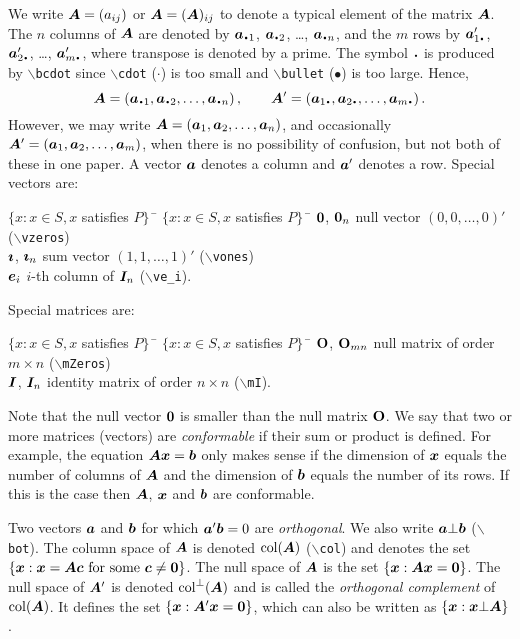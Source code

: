 \documentclass[11pt,dvips,a4paper]{article}
\newcommand{\hspacesymbols}%
   {$\{x: x \in S, x$ satisfies $P\}\;\;$} %
\newcommand{\type}[1]{{\tt$\backslash$#1}}
\begin{document}
We write $\bm A=(a_{ij})$ or $\bm A=(\bm A)_{ij}$ to denote a typical
element of the matrix $\bm A$.
The $n$ columns of $\bm A$ are denoted by
$\va_{\bcdot 1}$, $\va_{\bcdot 2}$, \dots, $\va_{\bcdot n}$,
and the $m$ rows by
$\va'_{1\bcdot}$, $\va'_{2\bcdot}$, \dots, $\va'_{m\bcdot}$,
where transpose is denoted by a prime.
The symbol $\bcdot$ is produced by \type{bcdot} since
\type{cdot} ($\cdot$) is too small
and \type{bullet} ($\bullet$) is too large.
Hence,
$$
\mA=\left(\va_{\bcdot 1}, \va_{\bcdot 2}, \dots, \va_{\bcdot n}\right),
\qquad
\mA'=\left(\va_{1\bcdot}, \va_{2\bcdot}, \dots, \va_{m\bcdot}\right).
$$
However, we may write
$\bm A=\left(\bm a_{1}, \bm a_{2}, \dots, \bm a_{n}\right)$,
and occasionally
$\bm A'=\left(\bm a_{1}, \bm a_{2}, \dots, \bm a_{m}\right)$,
when there is no possibility of confusion,
but not both of these in one paper.
A vector $\bm a$ denotes a column and $\bm a'$ denotes a row.
Special vectors are:
\begin{tabbing}
\hspacesymbols \= \hspacesymbols\quad \=  \kill
$\boldsymbol{0}$, $\boldsymbol{0}_n$ \> null vector $(0,0,\dots,0)'$ (\type{vzeros})\\
$\bm\imath$, $\bm\imath_n$ \> sum vector $(1,1,\dots,1)'$  (\type{vones})\\
$\bm e_i$ \> $i$-th column of $\bm I_n$ (\type{ve\_i}).
\end{tabbing}
Special matrices are:
\begin{tabbing}
\hspacesymbols \= \hspacesymbols\qquad\quad \= \kill
$\mathbf{O}$, $\mathbf{O}_{mn}$ \> null matrix of order $m\times n$ (\type{mZeros}) \\
$\bm I$, $\bm I_n$ \> identity matrix of order $n\times n$ (\type{mI}).
\end{tabbing}
Note that the null vector $\boldsymbol{0}$ is smaller
than the null matrix $\mathbf{O}$.
We say that two or more matrices (vectors) are {\it conformable\/}
if their sum or product is defined. For example, the equation
$\bm A\bm x=\bm b$ only makes sense if the dimension of $\bm x$ equals the number
of columns of $\bm A$ and the dimension of $\bm b$ equals the number
of its rows.
If this is the case then $\bm A$, $\bm x$ and $\bm b$ are conformable.

Two vectors $\bm a$ and $\bm b$ for which $\bm a'\bm b=0$ are {\it orthogonal\/}.
We also write $\bm a\bot\bm b$ (\type{bot}).
The column space of $\bm A$ is denoted $\operatorname{col}(\bm A)$ (\type{col}) and denotes
the set $\{\bm x: \bm x=\bm A\bm c \text{ for some } \bm c\ne \boldsymbol{0}\}$.
The null space of $\bm A$ is the set $\{\bm x:\bm A\bm x=\boldsymbol{0}\}$.
The null space of $\bm A'$ is denoted $\operatorname{col}^{\bot}(\bm A)$
and is called the {\it orthogonal complement\/} of $\operatorname{col}(\bm A)$.
It defines the set $\{\bm x:\bm A'\bm x=\boldsymbol{0}\}$,
which can also be written as $\{\bm x:\bm x\bot\bm A\}$.
%
\end{document}
